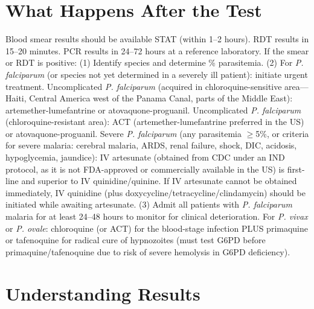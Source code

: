 \section*{What Happens After the Test}
Blood smear results should be available STAT (within 1--2 hours). RDT results in 15--20 minutes. PCR results in 24--72 hours at a reference laboratory. If the smear or RDT is positive: (1) Identify species and determine \% parasitemia. (2) For \textit{P. falciparum} (or species not yet determined in a severely ill patient): initiate urgent treatment. Uncomplicated \textit{P. falciparum} (acquired in chloroquine-sensitive area---Haiti, Central America west of the Panama Canal, parts of the Middle East): artemether-lumefantrine or atovaquone-proguanil. Uncomplicated \textit{P. falciparum} (chloroquine-resistant area): ACT (artemether-lumefantrine preferred in the US) or atovaquone-proguanil. Severe \textit{P. falciparum} (any parasitemia $\geq$5\%, or criteria for severe malaria: cerebral malaria, ARDS, renal failure, shock, DIC, acidosis, hypoglycemia, jaundice): IV artesunate (obtained from CDC under an IND protocol, as it is not FDA-approved or commercially available in the US) is first-line and superior to IV quinidine/quinine. If IV artesunate cannot be obtained immediately, IV quinidine (plus doxycycline/tetracycline/clindamycin) should be initiated while awaiting artesunate. (3) Admit all patients with \textit{P. falciparum} malaria for at least 24--48 hours to monitor for clinical deterioration. For \textit{P. vivax} or \textit{P. ovale}: chloroquine (or ACT) for the blood-stage infection PLUS primaquine or tafenoquine for radical cure of hypnozoites (must test G6PD before primaquine/tafenoquine due to risk of severe hemolysis in G6PD deficiency).

\section*{Understanding Results}

